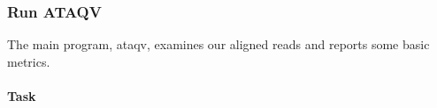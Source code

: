 \documentclass[12pt]{article}
\begin{document}
		\subsubsection{Run ATAQV}
			The main program, ataqv, examines our aligned reads and reports some basic metrics.
			
%			
%			
			
			\paragraph{Task}
			
\end{document}
